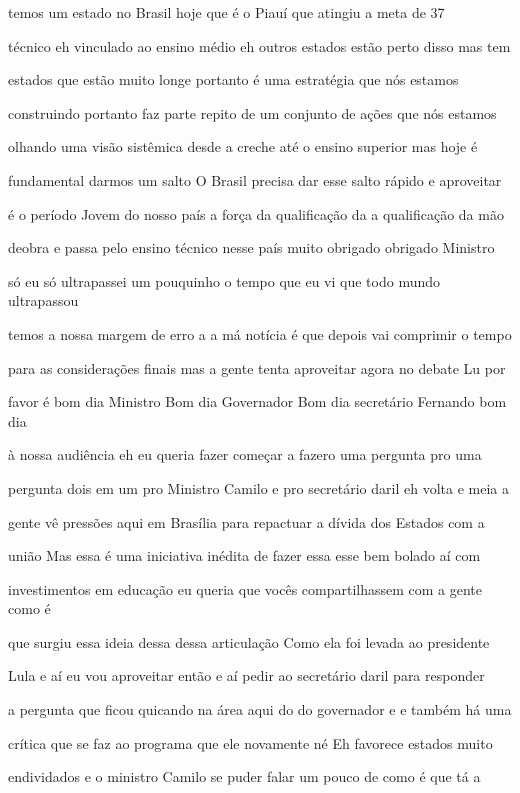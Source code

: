 \documentclass[a4paper,12pt]{article}
\begin{document}
temos um estado no Brasil hoje que é o Piauí que atingiu a meta de 37%

técnico eh vinculado ao ensino médio eh outros estados estão perto disso mas tem

estados que estão muito longe portanto é uma estratégia que nós estamos

construindo portanto faz parte repito de um conjunto de ações que nós estamos

olhando uma visão sistêmica desde a creche até o ensino superior mas hoje é

fundamental darmos um salto O Brasil precisa dar esse salto rápido e aproveitar

é o período Jovem do nosso país a força da qualificação da a qualificação da mão

deobra e passa pelo ensino técnico nesse país muito obrigado obrigado Ministro

só eu só ultrapassei um pouquinho o tempo que eu vi que todo mundo ultrapassou

temos a nossa margem de erro a a má notícia é que depois vai comprimir o tempo

para as considerações finais mas a gente tenta aproveitar agora no debate Lu por

favor é bom dia Ministro Bom dia Governador Bom dia secretário Fernando bom dia

à nossa audiência eh eu queria fazer começar a fazero uma pergunta pro uma

pergunta dois em um pro Ministro Camilo e pro secretário daril eh volta e meia a

gente vê pressões aqui em Brasília para repactuar a dívida dos Estados com a

união Mas essa é uma iniciativa inédita de fazer essa esse bem bolado aí com

investimentos em educação eu queria que vocês compartilhassem com a gente como é

que surgiu essa ideia dessa dessa articulação Como ela foi levada ao presidente

Lula e aí eu vou aproveitar então e aí pedir ao secretário daril para responder

a pergunta que ficou quicando na área aqui do do governador e e também há uma

crítica que se faz ao programa que ele novamente né Eh favorece estados muito

endividados e o ministro Camilo se puder falar um pouco de como é que tá a
\end{document}

